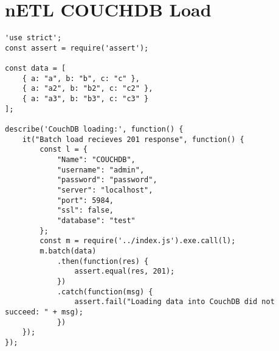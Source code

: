 \section{nETL COUCHDB Load}
\label{COUCHDB-tests}
\begin{verbatim}
'use strict';
const assert = require('assert');

const data = [
    { a: "a", b: "b", c: "c" },
    { a: "a2", b: "b2", c: "c2" },
    { a: "a3", b: "b3", c: "c3" }
];

describe('CouchDB loading:', function() {
    it("Batch load recieves 201 response", function() {
        const l = {
            "Name": "COUCHDB",
            "username": "admin",
            "password": "password",
            "server": "localhost",
            "port": 5984,
            "ssl": false,
            "database": "test"
        };
        const m = require('../index.js').exe.call(l);
        m.batch(data)
            .then(function(res) {
                assert.equal(res, 201);
            })
            .catch(function(msg) {
                assert.fail("Loading data into CouchDB did not succeed: " + msg);
            })
    });
});
\end{verbatim}